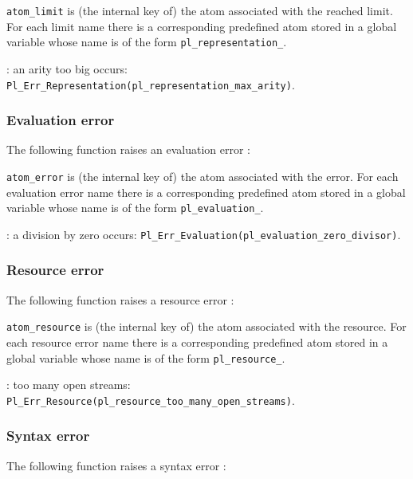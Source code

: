 
\texttt{atom\_limit} is (the internal key of) the atom associated with the
reached limit. For each limit name  there is a
corresponding predefined atom stored in a global variable whose name is of
the form \texttt{pl\_representation\_}.

: an arity too big occurs:
\texttt{Pl\_Err\_Representation(pl\_representation\_max\_arity)}.

\subsubsection{Evaluation error}
The following function raises an evaluation error :


\texttt{atom\_error} is (the internal key of) the atom associated with the
error. For each evaluation error name  there is a
corresponding predefined atom stored in a global variable whose name is of
the form \texttt{pl\_evaluation\_}.

: a division by zero occurs:
\texttt{Pl\_Err\_Evaluation(pl\_evaluation\_zero\_divisor)}.

\subsubsection{Resource error}
The following function raises a resource error :


\texttt{atom\_resource} is (the internal key of) the atom associated with the
resource. For each resource error name  there is a
corresponding predefined atom stored in a global variable whose name is of
the form \texttt{pl\_resource\_}.

: too many open streams:
\texttt{Pl\_Err\_Resource(pl\_resource\_too\_many\_open\_streams)}.

\subsubsection{Syntax error}
The following function raises a syntax error :


